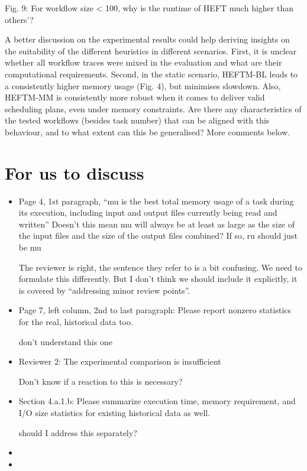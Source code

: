 \documentclass{article}
\begin{document}
    Fig. 9: For workflow size < 100, why is the runtime of HEFT much higher than others'?

    A better discussion on the experimental results could help deriving
    insights on the suitability of the different heuristics in different
    scenarios. First, it is unclear whether all workflow traces were mixed
    in the evaluation and what are their computational requirements. Second,
    in the static scenario, HEFTM-BL leads to a consistently higher memory
    usage (Fig. 4), but minimises slowdown. Also, HEFTM-MM is consistently
    more robust when it comes to deliver valid scheduling plans, even under
    memory constraints. Are there any characteristics of the tested
    workflows (besides task number) that can be aligned with this behaviour,
    and to what extent can this be generalised? More comments below.




    \section{For us to discuss}

    \begin{itemize}
        \item Page 4, 1st paragraph, ``mu is the best total memory usage of a task during its execution, including input and output files currently being read and written''
        Doesn't this mean mu will always be at least as large as the size of the input files and the size of the output files combined? If so, ru should just be mu

        The reviewer is right, the sentence they refer to is a bit confusing. We need to formulate this differently.
        But I don't think we should include it explicitly, it is covered by ``addressing minor review points''.

        \item  Page 7, left column, 2nd to last paragraph: Please report nonzero statistics for the real, historical data too.

        don't understand this one
        \item Reviewer 2: The experimental comparison is insufficient

        Don't know if a reaction to this is necessary?
        \item  Section 4.a.1.b: Please summarize execution time, memory requirement, and I/O size statistics for existing historical data as well.

        should I address this separately?
        \item
        \item

    \end{itemize}
\end{document}
